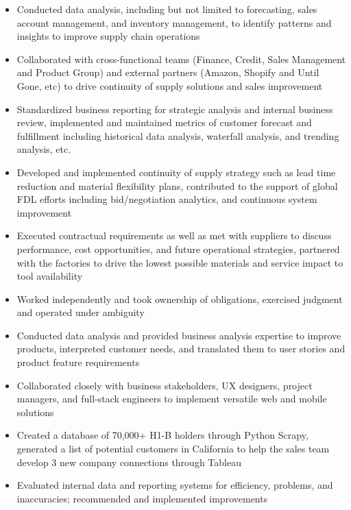 \documentclass{resume}
\begin{document}
\begin{itemize}
      \item Conducted data analysis, including but not limited to forecasting,
            sales account management, and inventory management, to identify
            patterns and insights to improve supply chain operations
      \item Collaborated with cross-functional teams (Finance, Credit, Sales
            Management and Product Group) and external partners (Amazon,
            Shopify and Until Gone, etc) to drive continuity of supply
            solutions and sales improvement
      \item Standardized business reporting for strategic analysis and internal
            business review, implemented and maintained metrics of customer
            forecast and fulfillment including historical data analysis,
            waterfall analysis, and trending analysis, etc.
      \item Developed and implemented continuity of supply strategy such as
            lead time reduction and material flexibility plans, contributed to
            the support of global FDL efforts including bid/negotiation
            analytics, and continuous system improvement
      \item Executed contractual requirements as well as met with suppliers to
            discuss performance, cost opportunities, and future operational
            strategies, partnered with the factories to drive the lowest
            possible materials and service impact to tool availability
      \item Worked independently and took ownership of obligations, exercised
            judgment and operated under ambiguity
\end{itemize}

\begin{itemize}
      \item Conducted data analysis and provided business analysis expertise to
            improve products, interpreted customer needs, and translated them
            to user stories and product feature requirements
      \item Collaborated closely with business stakeholders, UX designers,
            project managers, and full-stack engineers to implement versatile
            web and mobile solutions
      \item Created a database of 70,000+ H1-B holders through Python Scrapy,
            generated a list of potential customers in California to help the
            sales team develop 3 new company connections through Tableau
      \item Evaluated internal data and reporting systems for efficiency,
            problems, and inaccuracies; recommended and implemented
            improvements
\end{itemize}
\end{document}
